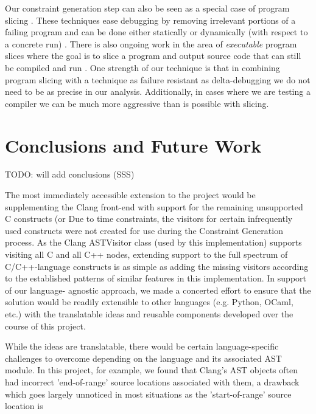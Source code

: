 \documentclass[preprint]{acm_proc_article-sp}
\begin{document}
Our constraint generation step can also be seen as a special case of program
slicing \citep{weiser81} \citep{tip94}. These techniques ease debugging by
removing irrelevant portions of a failing program and can be done either
statically or dynamically (with respect to a concrete run)
\citep{agrawal90}. There is also ongoing work in the area of \emph{executable}
program slices where the goal is to slice a program and output source code
that can still be compiled and run \citep{horwitz10}. One strength of our
technique is that in combining program slicing with a technique as failure
resistant as delta-debugging we do not need to be as precise in our
analysis. Additionally, in cases where we are testing a compiler we can be much
more aggressive than is possible with slicing.


\section{Conclusions and Future Work}
TODO: will add conclusions (SSS)

The most immediately accessible extension to the project would be supplementing
the Clang front-end with support for the remaining unsupported C constructs (or
Due to time constraints, the visitors for certain infrequently used constructs
were not created for use during the Constraint Generation process. As the Clang
ASTVisitor class (used by this implementation) supports visiting all C and all
C++ nodes, extending support to the full spectrum of C/C++-language constructs
is as simple as adding the missing visitors according to the established
patterns of similar features in this implementation. In support of our language-
agnostic approach, we made a concerted effort to ensure that the solution would
be readily extensible to other languages (e.g. Python, OCaml, etc.) with the
translatable ideas and reusable components developed over the course of this
project.

While the ideas are translatable, there would be certain language-specific
challenges to overcome depending on the language and its associated AST module.
In this project, for example, we found that Clang's AST objects often had
incorrect 'end-of-range' source locations associated with them, a drawback which
goes largely unnoticed in most situations as the 'start-of-range' source
location is

\end{document}
